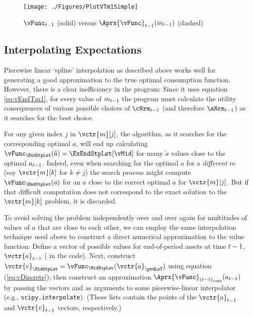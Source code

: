 \documentclass[\econtexRoot/SolvingMicroDSOPs]{subfiles}
\begin{document}
\hypertarget{PlotvTm1Simple}{}
\begin{figure}
  \centerline{\texttt{[image: ./Figures/PlotVTm1Simple]}}
  \caption{$\vFunc_{\prdT-1}$ (solid) versus $\Aprx{\vFunc}_{\prdT-1}({m}_{\prdT-1})$ (dashed)}
  \label{fig:PlotVTm1Simple}
\end{figure}

\hypertarget{interpolating-expectations}{}
\subsection{Interpolating Expectations}


Piecewise linear `spline' interpolation as described above works well for generating a good approximation to the true optimal consumption function. However, there is a clear inefficiency in the program: Since it uses equation \eqref{eq:vEndTm1}, for every value of ${m}_{t-1}$ the program must calculate the utility consequences of various possible choices of $\cNrm_{\prdT-1}$ (and therefore $\aNrm_{\prdT-1}$) as it searches for the best choice.

For any given index $j$ in $\vctr{m}[j]$, the algorithm, as it searches for the corresponding optimal $a$, will end up  calculating $\vFunc_{\EndStpLst}(\tilde{a}) = \ExEndStpLst[\vMid]$ for many $\tilde{a}$ values close to the optimal ${a}_{t-1}$.  Indeed, even when searching for the optimal ${a}$ for a \emph{different} ${m}$ (say $\vctr{m}[k]$ for $k \neq j$) the search process might compute $\vFunc_{\EndStpLst}({a})$ for an ${a}$ close to the correct optimal ${a}$ for $\vctr{m}[j]$. But if that difficult computation does not correspond to the exact solution to the $\vctr{m}[k]$ problem, it is discarded.  

To avoid solving the problem independently over and over again for multitudes of values of ${a}$ that are close to each other, we can employ the same interpolation technique used above to construct a direct numerical approximation to the value function: Define a vector of possible values for end-of-period assets at time $t-1$, $\vctr{{a}}_{\prdT-1}$ ( in the code). Next, construct $\vctr{{v}}_{\MidStpLst} = \vFunc_{\MidStpLst}(\vctr{{a}}_{\prdLsT})$ using equation (\ref{eq:vDiscrete}); then construct an approximation $\Aprx{\vFunc}_{({\prdT-1})_\cntn}({a}_{\prdT-1})$ by passing the vectors {\aVec} and {\vVec} as arguments to some piecewise-linear interpolator (e.g., \texttt{scipy.interpolate}).  (These lists contain the points of the $\vctr{a}_{{\prdT-1}}$ and $\vctr{{v}}_{{\prdT-1}}$ vectors, respectively.)
\end{document}
